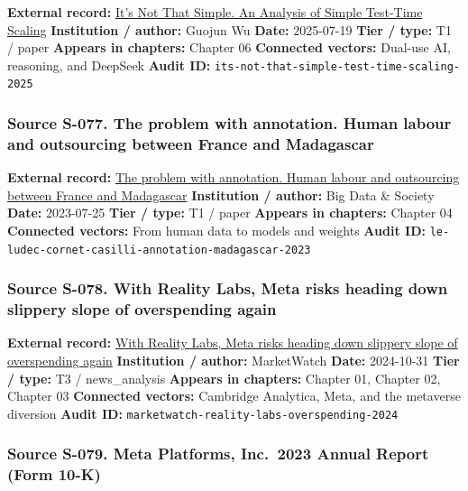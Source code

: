 \documentclass[
  american,
  11pt,
  letterpaper,
]{article}
\begin{document}
\textbf{External record:} \href{https://arxiv.org/abs/2507.14419}{It's
Not That Simple. An Analysis of Simple Test-Time Scaling}
\textbf{Institution / author:} Guojun Wu \textbf{Date:} 2025-07-19
\textbf{Tier / type:} T1 / paper \textbf{Appears in chapters:} Chapter
06 \textbf{Connected vectors:} Dual-use AI, reasoning, and DeepSeek
\textbf{Audit ID:} \texttt{its-not-that-simple-test-time-scaling-2025}

\subsubsection{Source S-077. The problem with annotation. Human labour
and outsourcing between France and
Madagascar}\label{source-s-077-the-problem-with-annotation-human-labour-and-outsourcing-between-france-and-madagascar}

\textbf{External record:}
\href{https://journals.sagepub.com/doi/10.1177/20539517231188723}{The
problem with annotation. Human labour and outsourcing between France and
Madagascar} \textbf{Institution / author:} Big Data \& Society
\textbf{Date:} 2023-07-25 \textbf{Tier / type:} T1 / paper
\textbf{Appears in chapters:} Chapter 04 \textbf{Connected vectors:}
From human data to models and weights \textbf{Audit ID:}
\texttt{le-ludec-cornet-casilli-annotation-madagascar-2023}

\subsubsection{Source S-078. With Reality Labs, Meta risks heading down
slippery slope of overspending
again}\label{source-s-078-with-reality-labs-meta-risks-heading-down-slippery-slope-of-overspending-again}

\textbf{External record:}
\href{https://www.marketwatch.com/story/with-reality-labs-meta-risks-heading-down-slippery-slope-of-overspending-again-75bd0adf}{With
Reality Labs, Meta risks heading down slippery slope of overspending
again} \textbf{Institution / author:} MarketWatch \textbf{Date:}
2024-10-31 \textbf{Tier / type:} T3 / news\_analysis \textbf{Appears in
chapters:} Chapter 01, Chapter 02, Chapter 03 \textbf{Connected
vectors:} Cambridge Analytica, Meta, and the metaverse diversion
\textbf{Audit ID:} \texttt{marketwatch-reality-labs-overspending-2024}

\subsubsection{Source S-079. Meta Platforms, Inc.~2023 Annual Report
(Form
10-K)}\label{source-s-079-meta-platforms-inc-2023-annual-report-form-10-k}
\end{document}
